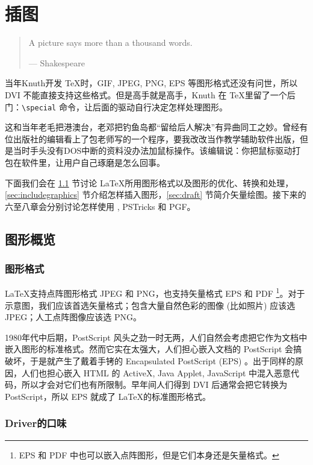 \chapter{插图}\label{sec:graphics}

\begin{quotation}
A picture says more than a thousand words.
\begin{flushright}
--- Shakespeare
\end{flushright}
\end{quotation}

当年Knuth开发 \TeX 时，GIF, JPEG, PNG, EPS 等图形格式还没有问世，所以 DVI 不能直接支持这些格式。但是高手就是高手，Knuth 在 \TeX 里留了一个后门：\verb|\special| 命令，让后面的驱动自行决定怎样处理图形。

这和当年老毛把港澳台，老邓把钓鱼岛都“留给后人解决”有异曲同工之妙。曾经有位出版社的编辑看上了包老师写的一个程序，要我改改当作教学辅助软件出版，但是当时手头没有DOS中断的资料没办法加鼠标操作。该编辑说：你把鼠标驱动打包在软件里，让用户自己琢磨是怎么回事。

下面我们会在 \ref{sec:graphics_format} 节讨论 \LaTeX 所用图形格式以及图形的优化、转换和处理，\ref{sec:includegraphics} 节介绍怎样插入图形，\ref{sec:draft} 节简介矢量绘图。接下来的六至八章会分别讨论怎样使用 \MP, PSTricks 和 PGF。

\section{图形概览}
\label{sec:graphics_format}

\subsection{图形格式}

\LaTeX 支持点阵图形格式 JPEG 和 PNG，也支持矢量格式 EPS 和 PDF \footnote{EPS 和 PDF 中也可以嵌入点阵图形，但是它们本身还是矢量格式。}。对于示意图，我们应该首选矢量格式；包含大量自然色彩的图像 (比如照片) 应该选 JPEG；人工点阵图像应该选 PNG。

1980年代中后期，PostScript 风头之劲一时无两，人们自然会考虑把它作为文档中嵌入图形的标准格式。然而它实在太强大，人们担心嵌入文档的 PostScript 会搞破坏，于是就产生了戴着手铐的 Encapsulated PostScript (EPS) 。出于同样的原因，人们也担心嵌入 HTML 的 ActiveX, Java Applet, JavaScript 中混入恶意代码，所以才会对它们也有所限制。早年间人们得到 DVI 后通常会把它转换为 PostScript，所以 EPS 就成了 \LaTeX 的标准图形格式。
 
\subsection{Driver的口味}

